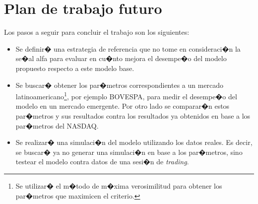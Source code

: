 \documentclass[12pt,a4paper,spanish]{article}%
\begin{document}
\section {Plan de trabajo futuro} \label{sec: futuro}
Los pasos a seguir para concluir el trabajo son los siguientes:
\begin{itemize}
	\item Se definir� una estrategia de referencia que no tome en consideraci�n la se�al alfa para evaluar en cu�nto mejora el desempe�o del modelo propuesto respecto a este modelo base.
	\item Se buscar� obtener los par�metros correspondientes a un mercado latinoamericano\footnote{Se utilizar� el m�todo de m�xima verosimilitud para obtener los par�metros que maximicen el criterio.}, por ejemplo BOVESPA, para medir el desempe�o del modelo en un mercado emergente. Por otro lado se comparar�n estos par�metros y sus resultados contra los resultados ya obtenidos en base a los par�metros del NASDAQ. 
	\item Se realizar� una simulaci�n del modelo utilizando los datos reales. Es decir, se buscar� ya no generar una simulaci�n en base a los par�metros, sino testear el modelo contra datos de una sesi�n de \textit{trading}.
\end{itemize}


\end{document}
